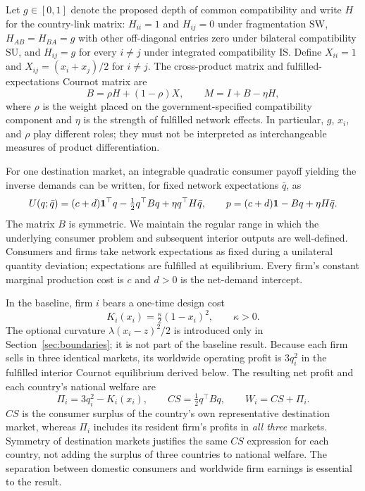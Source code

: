 \documentclass[11pt,a4paper]{article}
\theoremstyle{remark}\newtheorem{remark}[theorem]{Remark}
\newcommand{\SW}{\mathrm{SW}}\newcommand{\SU}{\mathrm{SU}}\newcommand{\IS}{\mathrm{IS}}
\begin{document}
Let $g\in[0,1]$ denote the proposed depth of common compatibility and write $H$ for the country-link matrix: $H_{ii}=1$ and $H_{ij}=0$ under fragmentation $\SW$, $H_{AB}=H_{BA}=g$ with other off-diagonal entries zero under bilateral compatibility $\SU$, and $H_{ij}=g$ for every $i\ne j$ under integrated compatibility $\IS$. Define $X_{ii}=1$ and $X_{ij}=(x_i+x_j)/2$ for $i\ne j$. The cross-product matrix and fulfilled-expectations Cournot matrix are
\begin{equation}\label{eq:matrices}
B=\rho H+(1-\rho)X,\qquad M=I+B-\eta H,
\end{equation}
where $\rho$ is the weight placed on the government-specified compatibility component and $\eta$ is the strength of fulfilled network effects. In particular, $g$, $x_i$, and $\rho$ play different roles; they must not be interpreted as interchangeable measures of product differentiation.

For one destination market, an integrable quadratic consumer payoff yielding the inverse demands can be written, for fixed network expectations $\bar{q}$, as
\begin{equation}\label{eq:consumer}
U(q;\bar q)=(c+d)\boldsymbol{1}^{\top}q-\tfrac12q^{\top}Bq+\eta q^{\top}H\bar q,\qquad
p=(c+d)\boldsymbol{1}-Bq+\eta H\bar q.
\end{equation}
The matrix $B$ is symmetric. We maintain the regular range in which the underlying consumer problem and subsequent interior outputs are well-defined. Consumers and firms take network expectations as fixed during a unilateral quantity deviation; expectations are fulfilled at equilibrium. Every firm's constant marginal production cost is $c$ and $d>0$ is the net-demand intercept.

In the baseline, firm $i$ bears a one-time design cost
\begin{equation}\label{eq:cost}
K_i(x_i)=\tfrac{\kappa}{2}(1-x_i)^2,\qquad\kappa>0.
\end{equation}
The optional curvature $\lambda(x_i-z)^2/2$ is introduced only in Section~\ref{sec:boundaries}; it is not part of the baseline result. Because each firm sells in three identical markets, its worldwide operating profit is $3q_i^2$ in the fulfilled interior Cournot equilibrium derived below. The resulting net profit and each country's national welfare are
\begin{equation}\label{eq:welfare}
\Pi_i=3q_i^2-K_i(x_i),\qquad CS=\tfrac12q^{\top}Bq,\qquad W_i=CS+\Pi_i.
\end{equation}
$CS$ is the consumer surplus of the country's own representative destination market, whereas $\Pi_i$ includes its resident firm's profits in \emph{all three} markets. Symmetry of destination markets justifies the same $CS$ expression for each country, not adding the surplus of three countries to national welfare. The separation between domestic consumers and worldwide firm earnings is essential to the result.
\end{document}
